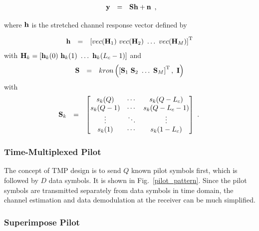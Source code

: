 \documentclass[10pt,fleqn, twocolumn]{IEEEtran}
\newcommand{\bh}{{\bf h}}
\newcommand{\bH}{{\bf H}}
\newcommand{\bn}{{\bf n}}
\newcommand{\by}{{\bf y}}
\newcommand{\bS}{{\bf S}}
\newcommand{\bI}{{\bf I}}
\begin{document}
\begin{equation}\hspace{-0.00in}
\begin{array}{rcl}
\by&=&\bS\bh+\bn
\end{array},
\end{equation}

\noindent where $\bh$ is the stretched channel response vector
defined by

\begin{equation}\hspace{-0.00in}
\begin{array}{rcl}
\bh&=&\left[\mbox{vec}(\bH_{1})\ \mbox{vec}(\bH_{2})\ \ldots\
\mbox{vec}(\bH_{M})\right]^{\rm T}
\end{array}
\end{equation}
\noindent with $\bH_{k}=\left[\bh_{k}(0)\ \bh_{k}(1)\ \ldots\
\bh_{k}(L_{c}-1)\right]$ and
\begin{equation}\hspace{-0.00in}
\begin{array}{rcl}
\bS&=&\mbox{kron}\left(\left[\bS_{1}\ \bS_{2}\ \ldots\
\bS_{M}\right]^{\rm T},\ \bI\right)
\end{array}
\end{equation}
\noindent with
\begin{equation}\hspace{-0.10in}
\begin{array}{rcl}
\bS_{k}&=&\left[\begin{matrix}
s_{k}(Q)&\cdots&s_{k}(Q-L_{c})\\
s_{k}(Q-1)&\cdots&s_{k}(Q-L_{c}-1)\\
\vdots&\ddots&\vdots\\
s_{k}(1)&\cdots&s_{k}(1-L_{c})
\end{matrix}\right]
\end{array}.
\end{equation}

\subsubsection{Time-Multiplexed Pilot}
The concept of TMP design is to send $Q$ known pilot symbols
first, which is followed by $D$ data symbols. It is shown in
Fig.~\ref{pilot_pattern}. Since the pilot symbols are transmitted
separately from data symbols in time domain, the channel
estimation and data demodulation at the receiver can be much
simplified.

\subsubsection{Superimpose Pilot}
\end{document}

